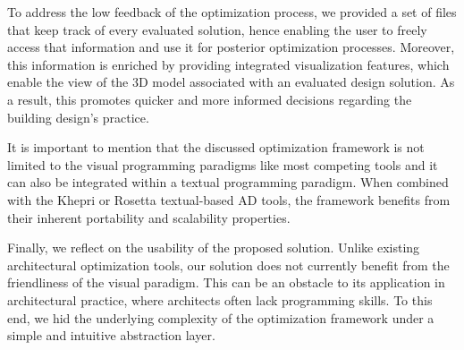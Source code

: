 To address the low feedback of the optimization process, we provided a set of files that keep track of every evaluated solution, hence enabling the user to freely access that information and use it for posterior optimization processes. Moreover, this information is enriched by providing integrated visualization features, which enable the view of the 3D model associated with an evaluated design solution. As a result, this promotes quicker and more informed decisions regarding the building design's practice.

It is important to mention that the discussed optimization framework is not limited to the visual programming paradigms like most competing tools and it can also be integrated within a textual programming paradigm. When combined with the Khepri or Rosetta textual-based \ac{AD} tools, the framework benefits from their inherent portability and scalability properties. 

Finally, we reflect on the usability of the proposed solution. Unlike existing architectural optimization tools, our solution does not currently benefit from the friendliness of the visual paradigm. This can be an obstacle to its application in architectural practice, where architects often lack programming skills. To this end, we hid the underlying complexity of the optimization framework under a simple and intuitive abstraction layer. 


